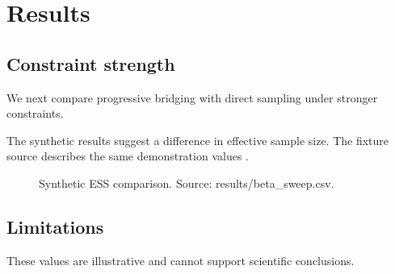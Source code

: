 \section{Results}
\label{sec:results}
\subsection{Constraint strength}
We next compare progressive bridging with direct sampling under stronger constraints.

The synthetic results suggest a difference in effective sample size.
The fixture source describes the same demonstration values \cite{fixture2026}.

\begin{figure}
  \centering
  \caption{Synthetic ESS comparison. Source: results/beta_sweep.csv.}
  \label{fig:beta-sweep}
\end{figure}

\subsection{Limitations}
These values are illustrative and cannot support scientific conclusions.
